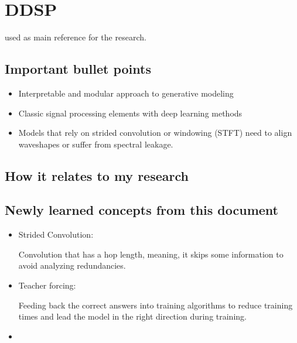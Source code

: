 \section{DDSP}

\cite{DDSP} used as main reference for the research.

\subsection{Important bullet points}

\begin{itemize}
    \item Interpretable and modular approach to generative modeling
    \item Classic signal processing elements with deep learning methods
    \item Models that rely on strided convolution or windowing (STFT)
    need to align waveshapes or suffer from spectral leakage.
\end{itemize}

\subsection{How it relates to my research}

\subsection{Newly learned concepts from this document}

\begin{itemize}
    \item Strided Convolution:
    
    Convolution that has a hop length, meaning, it skips some information
    to avoid analyzing redundancies.

    \item Teacher forcing:
    
    Feeding back the correct answers into training algorithms 
    to reduce training times and lead the model in the right direction during training.

    \item 
\end{itemize}